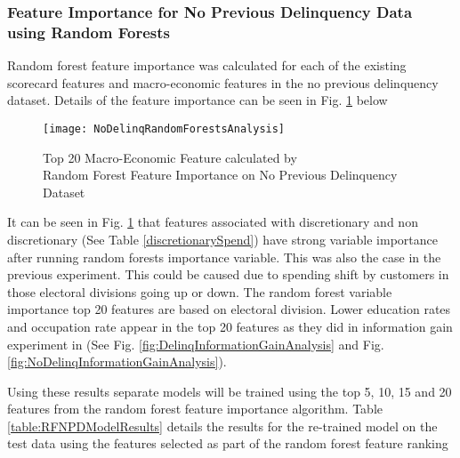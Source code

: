 \subsubsection{Feature Importance for No Previous Delinquency Data using Random Forests}\label{RFNPDExper}

Random forest feature importance was calculated for
each of the existing scorecard features and macro-economic features in the no previous delinquency dataset. Details of the feature importance can be seen in Fig. \ref{fig:NoDelinqRandomForestsAnalysis} below

\begin{figure}[H]
	\texttt{[image: NoDelinqRandomForestsAnalysis]}
	\caption{Top 20 Macro-Economic Feature calculated by \\
		Random Forest Feature Importance on No Previous Delinquency Dataset}
	\label{fig:NoDelinqRandomForestsAnalysis}
\end{figure}


It can be seen in Fig. \ref{fig:NoDelinqRandomForestsAnalysis} that features associated with discretionary and non discretionary (See Table \ref{discretionarySpend}) have strong variable importance after running random forests importance variable. This was also the case in the previous experiment. This could be caused due to spending shift by customers in those electoral divisions going up or down. The random forest variable importance top 20 features are based on electoral division. Lower education rates and occupation rate appear in the top 20 features as they did in information gain experiment in (See Fig. \ref{fig:DelinqInformationGainAnalysis} and Fig. \ref{fig:NoDelinqInformationGainAnalysis}).


Using these results separate models will be trained using the top 5, 10, 15 and 20 features from
the random forest feature importance algorithm. Table \ref{table:RFNPDModelResults} details the results for the re-trained model
on the test data using the features selected as part of the random forest feature ranking

